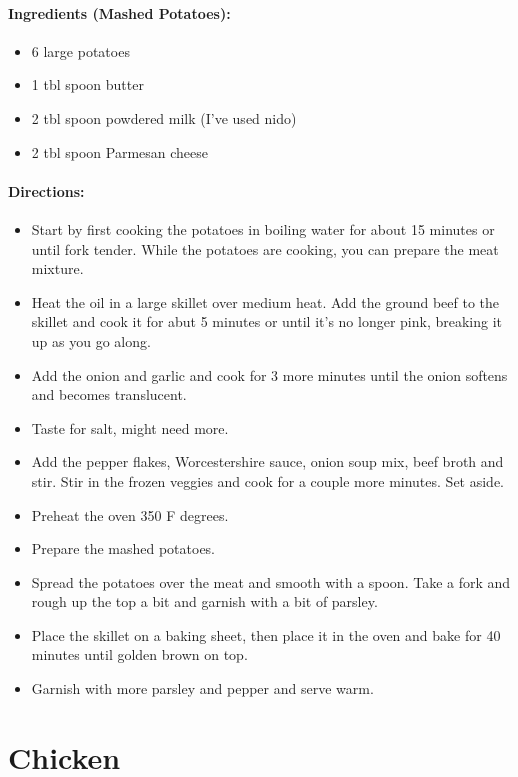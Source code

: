 \documentclass{article}
\begin{document}
\paragraph{Ingredients (Mashed Potatoes):}
\begin{itemize}
  \item 6 large potatoes
  \item 1 tbl spoon butter
  \item 2 tbl spoon powdered milk (I’ve used nido)
  \item 2 tbl spoon Parmesan cheese
\end{itemize}

\paragraph{Directions:}
\begin{itemize}
  \item Start by first cooking the potatoes in boiling water for about 15 minutes or until fork tender. While the
potatoes are cooking, you can prepare the meat mixture.
  \item Heat the oil in a large skillet over medium heat. Add the ground beef to the skillet and cook it for abut
5 minutes or until it’s no longer pink, breaking it up as you go along.
  \item Add the onion and garlic and cook for 3 more minutes until the onion softens and becomes translucent.
  \item Taste for salt, might need more.
  \item Add the pepper flakes, Worcestershire sauce, onion soup mix, beef broth and stir. Stir in the frozen
veggies and cook for a couple more minutes. Set aside.
  \item Preheat the oven 350 F degrees.
  \item Prepare the mashed potatoes.
  \item Spread the potatoes over the meat and smooth with a spoon. Take a fork and rough up the top a bit and
garnish with a bit of parsley.
  \item Place the skillet on a baking sheet, then place it in the oven and bake for 40 minutes until golden brown
on top.
  \item Garnish with more parsley and pepper and serve warm.
\end{itemize}


\section{Chicken}
\end{document}
